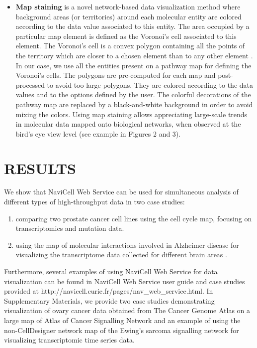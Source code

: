 \documentclass[a4,center,fleqn]{NAR}
\begin{document}
\begin{itemize}
\item \textbf{Map staining} is a novel network-based data visualization method where
background areas (or territories) around each molecular entity are colored according to the data
value associated to this entity. The area occupied by a particular map element is defined as the Voronoi's cell
associated to this element. The Voronoi's cell is a convex polygon containing all the points
of the territory which are closer to a chosen element than to any other element
\cite{aurenhammer1991voronoi}. In our case, we use all the entities present on a pathway map
for defining the Voronoi's cells. The polygons are pre-computed for each map and post-processed
to avoid too large polygons. They are colored according to the data values and to the options
defined by the user. The colorful decorations of the pathway map
are replaced by a black-and-white background in order to avoid mixing the colors.
Using map staining allows appreciating large-scale trends in molecular data mapped
onto biological networks, when observed at the bird's eye view level (see example in Figures 2 and 3).

\end{itemize}



\section{RESULTS}

We show that NaviCell Web Service can be used for simultaneous analysis of
different types of high-throughput data in two case studies:
\begin{enumerate}
\item comparing two prostate cancer cell lines using the cell cycle map,
focusing on transcriptomics and mutation data.

\item using the map of molecular interactions involved in Alzheimer disease
\cite{Mizuno2012} for visualizing the transcriptome data collected for
different brain areas \cite{hokama2013altered}.
\end{enumerate}

Furthermore, several examples of using NaviCell Web Service for data
visualization can be found in NaviCell Web Service user guide and case studies
provided at http://navicell.curie.fr/pages/nav\_web\_service.html. In Supplementary
Materials, we provide two case studies demonstrating visualization of ovary cancer data obtained from The Cancer Genome
Atlas \cite{TCGA2011Ovarian} on a large map of Atlas of Cancer Signalling
Network \cite{Kuperstein2015} and an example of using the non-CellDesigner network map
of the Ewing's sarcoma signalling network \cite{Stoll2013} for visualizing transcriptomic time series data.
\end{document}
